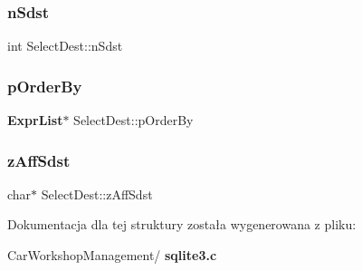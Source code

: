 \mbox{\label{struct_select_dest_aa4e7438446ef26231f7426edfda13e19}} 
\subsubsection{nSdst}
{\footnotesize\ttfamily int Select\+Dest\+::n\+Sdst}

\mbox{\label{struct_select_dest_a10881e4ffff470814a592d6d7e1541fa}} 
\subsubsection{pOrderBy}
{\footnotesize\ttfamily \textbf{ Expr\+List}$\ast$ Select\+Dest\+::p\+Order\+By}

\mbox{\label{struct_select_dest_ada0376591a63aacaf9f39f9b45bb7178}} 
\subsubsection{zAffSdst}
{\footnotesize\ttfamily char$\ast$ Select\+Dest\+::z\+Aff\+Sdst}



Dokumentacja dla tej struktury została wygenerowana z pliku\+:\begin{DoxyCompactItemize}
\item 
Car\+Workshop\+Management/\textbf{ sqlite3.\+c}\end{DoxyCompactItemize}
